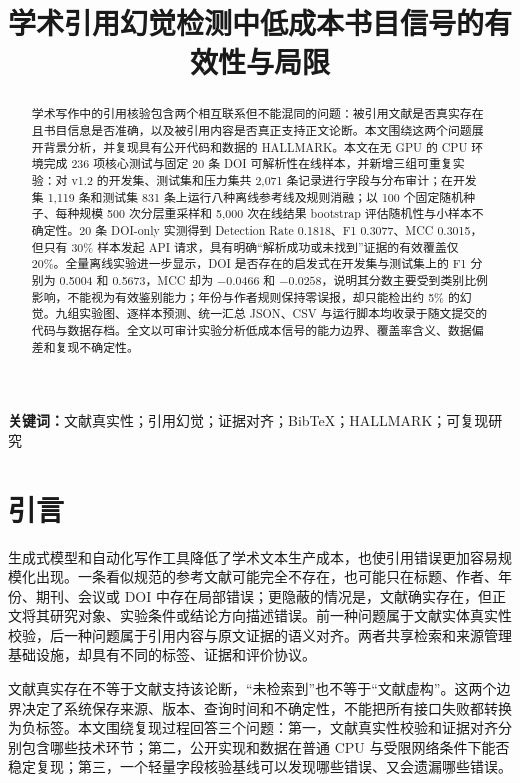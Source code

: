 \documentclass[UTF8,a4paper,11pt]{ctexart}
\title{学术引用幻觉检测中低成本书目信号的有效性与局限}
\author{}
\date{}
\begin{document}
\maketitle

\begin{abstract}
学术写作中的引用核验包含两个相互联系但不能混同的问题：被引用文献是否真实存在且书目信息是否准确，以及被引用内容是否真正支持正文论断。本文围绕这两个问题展开背景分析，并复现具有公开代码和数据的 HALLMARK。本文在无 GPU 的 CPU 环境完成 236 项核心测试与固定 20 条 DOI 可解析性在线样本，并新增三组可重复实验：对 v1.2 的开发集、测试集和压力集共 2,071 条记录进行字段与分布审计；在开发集 1,119 条和测试集 831 条上运行八种离线参考线及规则消融；以 100 个固定随机种子、每种规模 500 次分层重采样和 5,000 次在线结果 bootstrap 评估随机性与小样本不确定性。20 条 DOI-only 实测得到 Detection Rate 0.1818、F1 0.3077、MCC 0.3015，但只有 30\% 样本发起 API 请求，具有明确“解析成功或未找到”证据的有效覆盖仅 20\%。全量离线实验进一步显示，DOI 是否存在的启发式在开发集与测试集上的 F1 分别为 0.5004 和 0.5673，MCC 却为 $-0.0466$ 和 $-0.0258$，说明其分数主要受到类别比例影响，不能视为有效鉴别能力；年份与作者规则保持零误报，却只能检出约 5\% 的幻觉。九组实验图、逐样本预测、统一汇总 JSON、CSV 与运行脚本均收录于随文提交的代码与数据存档。全文以可审计实验分析低成本信号的能力边界、覆盖率含义、数据偏差和复现不确定性。
\end{abstract}

\noindent\textbf{关键词：}文献真实性；引用幻觉；证据对齐；BibTeX；HALLMARK；可复现研究

\section{引言}

生成式模型和自动化写作工具降低了学术文本生产成本，也使引用错误更加容易规模化出现。一条看似规范的参考文献可能完全不存在，也可能只在标题、作者、年份、期刊、会议或 DOI 中存在局部错误；更隐蔽的情况是，文献确实存在，但正文将其研究对象、实验条件或结论方向描述错误。前一种问题属于文献实体真实性校验，后一种问题属于引用内容与原文证据的语义对齐。两者共享检索和来源管理基础设施，却具有不同的标签、证据和评价协议。

文献真实存在不等于文献支持该论断，“未检索到”也不等于“文献虚构”。这两个边界决定了系统保存来源、版本、查询时间和不确定性，不能把所有接口失败都转换为负标签。本文围绕复现过程回答三个问题：第一，文献真实性校验和证据对齐分别包含哪些技术环节；第二，公开实现和数据在普通 CPU 与受限网络条件下能否稳定复现；第三，一个轻量字段核验基线可以发现哪些错误、又会遗漏哪些错误。
\end{document}
